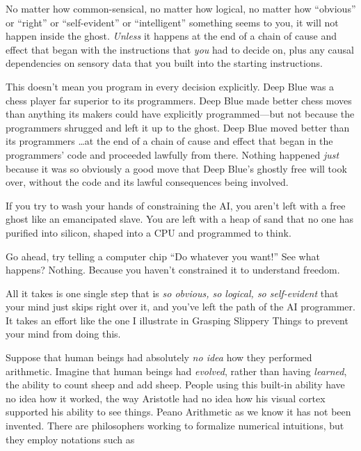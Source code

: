 {
 No matter how common-sensical, no matter how logical, no matter
how ``obvious'' or
``right'' or
``self-evident'' or
``intelligent'' something seems to
you, it will not happen inside the ghost. \textit{Unless} it happens at
the end of a chain of cause and effect that began with the instructions
that \textit{you} had to decide on, plus any causal dependencies on
sensory data that you built into the starting instructions.}

{
 This doesn't mean you program in every decision
explicitly. Deep Blue was a chess player far superior to its
programmers. Deep Blue made better chess moves than anything its makers
could have explicitly programmed---but not because the programmers
shrugged and left it up to the ghost. Deep Blue moved better than its
programmers \ldots at the end of a chain of cause and effect that began
in the programmers' code and proceeded lawfully from
there. Nothing happened \textit{just} because it was so obviously a
good move that Deep Blue's ghostly free will took over,
without the code and its lawful consequences being involved.}

{
 If you try to wash your hands of constraining the AI, you
aren't left with a free ghost like an emancipated
slave. You are left with a heap of sand that no one has purified into
silicon, shaped into a CPU and programmed to think.}

{
 Go ahead, try telling a computer chip ``Do
whatever you want!'' See what happens? Nothing.
Because you haven't constrained it to understand
freedom.}

{
 All it takes is one single step that is \textit{so obvious, so
logical, so self-evident} that your mind just skips right over it, and
you've left the path of the AI programmer. It takes an
effort like the one I illustrate in Grasping Slippery Things to prevent
your mind from doing this.}

\myendsectiontext


{
 Suppose that human beings had absolutely \textit{no idea} how they
performed arithmetic. Imagine that human beings had \textit{evolved},
rather than having \textit{learned}, the ability to count sheep and add
sheep. People using this built-in ability have no idea how it worked,
the way Aristotle had no idea how his visual cortex supported his
ability to see things. Peano Arithmetic as we know it has not been
invented. There are philosophers working to formalize numerical
intuitions, but they employ notations such as}


